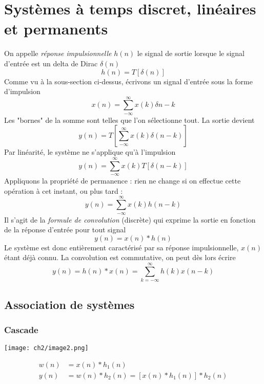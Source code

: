 \section{Systèmes à temps discret, linéaires et permanents}
On appelle \textit{réponse impulsionnelle} $h(n)$ le signal de sortie lorsque le 
signal d'entrée est un delta de Dirac $\delta(n)$
\begin{equation}
h(n) = T[\delta(n)]
\end{equation}
Comme vu à la sous-section ci-dessus, écrivons un signal d'entrée sous la forme 
d'impulsion
\begin{equation}
x(n) = \sum_{-\infty}^\infty x(k)\delta{n-k}
\end{equation}
Les "bornes" de la somme sont telles que l'on sélectionne tout. La sortie devient 
\begin{equation}
y(n) = T\left[\sum_{-\infty}^\infty x(k)\delta(n-k) \right]
\end{equation}
Par linéarité, le système ne s'applique qu'à l'impulsion
\begin{equation}
y(n) = \sum_{-\infty}^\infty x(k)T\left[\delta(n-k) \right]
\end{equation}
Appliquons la propriété de permanence : rien ne change si on effectue cette opération 
à cet instant, ou plus tard :
\begin{equation}
y(n) = \sum_{-\infty}^\infty x(k) h(n-k)
\end{equation}
Il s'agit de la \textit{formule de convolution} (discrète) qui exprime la sortie en 
fonction de la réponse d'entrée pour tout signal
\begin{equation}
y(n) = x(n) * h(n)
\end{equation}
Le système est donc entièrement caractérisé par sa réponse impulsionnelle, $x(n)$ 
étant déjà connu. La convolution est commutative, on peut dès lors écrire
\begin{equation}
y(n) = h(n)*x(n) = \sum_{k=-\infty}^\infty h(k)x(n-k)
\end{equation}
	
	\subsection{Association de systèmes}		
		\subsubsection{Cascade}
		\begin{center}
		\texttt{[image: ch2/image2.png]}
		\end{center}
		\begin{equation}
		\begin{array}{ll}
		w(n) &= x(n)*h_1(n)\\
		y(n) &= w(n)*h_2(n) = [x(n)*h_1(n)]*h_2(n)
		\end{array}
		\end{equation}
		
